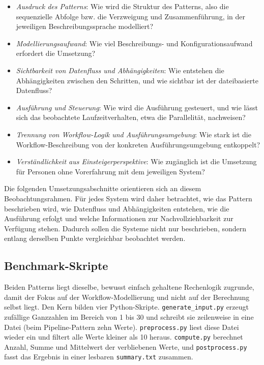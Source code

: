 \begin{itemize}
  \item \emph{Ausdruck des Patterns}: Wie wird die Struktur des Patterns, also die sequenzielle
    Abfolge bzw. die Verzweigung und Zusammenführung, in der jeweiligen Beschreibungssprache
    modelliert?
  \item \emph{Modellierungsaufwand}: Wie viel Beschreibungs- und Konfigurationsaufwand erfordert
    die Umsetzung?
  \item \emph{Sichtbarkeit von Datenfluss und Abhängigkeiten}: Wie entstehen die Abhängigkeiten
    zwischen den Schritten, und wie sichtbar ist der dateibasierte Datenfluss?
  \item \emph{Ausführung und Steuerung}: Wie wird die Ausführung gesteuert, und wie lässt sich das
    beobachtete Laufzeitverhalten, etwa die Parallelität, nachweisen?
  \item \emph{Trennung von Workflow-Logik und Ausführungsumgebung}: Wie stark ist die
    Workflow-Beschreibung von der konkreten Ausführungsumgebung entkoppelt?
  \item \emph{Verständlichkeit aus Einsteigerperspektive}: Wie zugänglich ist die Umsetzung für
    Personen ohne Vorerfahrung mit dem jeweiligen System?
\end{itemize}

Die folgenden Umsetzungsabschnitte orientieren sich an diesem Beobachtungsrahmen. Für jedes System
wird daher betrachtet, wie das Pattern beschrieben wird, wie Datenfluss und Abhängigkeiten
entstehen, wie die Ausführung erfolgt und welche Informationen zur Nachvollziehbarkeit zur
Verfügung stehen. Dadurch sollen die Systeme nicht nur beschrieben, sondern entlang derselben
Punkte vergleichbar beobachtet werden.

\subsection{Benchmark-Skripte}
\label{sec:practical:setup:scripts}

Beiden Patterns liegt dieselbe, bewusst einfach gehaltene Rechenlogik zugrunde, damit der Fokus
auf der Workflow-Modellierung und nicht auf der Berechnung selbst liegt. Den Kern bilden vier
Python-Skripte. \texttt{generate\_input.py} erzeugt zufällige Ganzzahlen im Bereich von 1 bis 30
und schreibt sie zeilenweise in eine Datei (beim Pipeline-Pattern zehn Werte). \texttt{preprocess.py}
liest diese Datei wieder ein und filtert alle Werte kleiner als 10 heraus. \texttt{compute.py}
berechnet Anzahl, Summe und Mittelwert der verbliebenen Werte, und \texttt{postprocess.py} fasst
das Ergebnis in einer lesbaren \texttt{summary.txt} zusammen.

